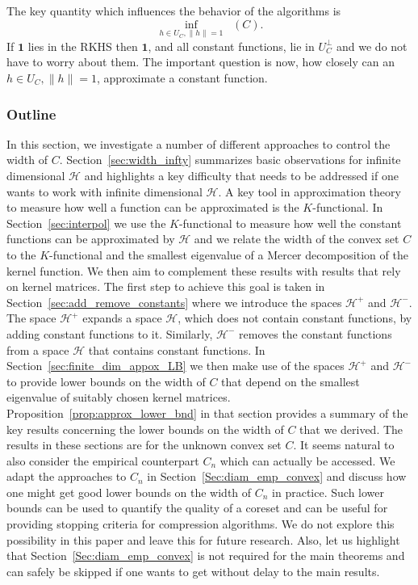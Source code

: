 \documentclass[10pt]{amsart}
\theoremstyle{definition}\newtheorem{defi}[theo]{Definition}\newtheorem{rema}[theo]{Remark}\newtheorem{exam}[theo]{Example}\newtheorem{exem}[theo]{Example}\newtheorem{nota}[theo]{Notation}
\theoremstyle{remark}
\DeclareMathOperator{\diamh}{{width}_h}
\newcommand{\cH}{\mathcal{H}}
\newcounter{setofstep}
\newcounter{step}[setofstep]
\begin{document}
The key quantity which influences the behavior of the algorithms is
\[
\inf_{h \in U_C, \|h\| =1} \diamh(C).
\]
If $\bm 1$ lies in the RKHS then $\bm 1$, and all constant functions, lie in $U_C^\perp$ and we do not have to worry about them. The important question is now, how closely can an $h \in U_C, \|h\| =1$, approximate a constant function.



\subsubsection{Outline} In this section, we investigate a number of different approaches to control the width of $C$. Section~\ref{sec:width_infty} summarizes basic observations for infinite dimensional $\cH$ and highlights a key difficulty that needs to be addressed if one wants to work with infinite dimensional $\cH$. A key tool in approximation theory to measure how well a function can be approximated is the $K$-functional. In Section~\ref{sec:interpol} we use the $K$-functional to measure how well the constant functions can be approximated by $\cH$ and we relate the width of the convex set $C$ to the $K$-functional and the smallest eigenvalue of a Mercer decomposition of the kernel function. We then aim to complement these results with results that rely on kernel matrices. The first step to achieve this goal is taken in Section~\ref{sec:add_remove_constants} where we introduce the spaces $\cH^+$ and $\cH^-$. The space $\cH^+$ expands a space $\cH$, which does not contain constant functions, by adding constant functions to it. Similarly, $\cH^-$ removes the constant functions from a space $\cH$ that contains constant functions. In Section~\ref{sec:finite_dim_appox_LB} we then make use of the spaces $\cH^+$ and $\cH^-$ to provide lower bounds on the width of $C$ that depend on the smallest eigenvalue of suitably chosen kernel matrices. Proposition~\ref{prop:approx_lower_bnd} in that section provides a summary of the key results concerning the lower bounds on the width of $C$ that we derived. The results in these sections are for the unknown convex set $C$. It seems natural to also consider the empirical counterpart $C_n$ which can actually be accessed. We adapt the approaches to $C_n$ in Section~\ref{Sec:diam_emp_convex} and discuss how one might get good lower bounds on the width of $C_n$ in practice. Such lower bounds can be used to quantify the quality of a coreset and can be useful for providing stopping criteria for compression algorithms. We do not explore this possibility in this paper and leave this for future research. Also, let us highlight that Section~\ref{Sec:diam_emp_convex} is not required for the main theorems and can safely be skipped if one wants to get without delay to the main results.
\end{document}
